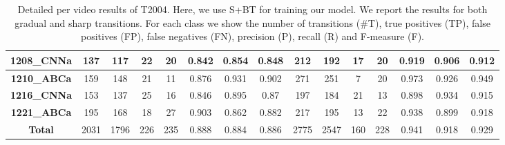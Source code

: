 \documentclass[journal]{IEEEtran}
\begin{document}
\begin{table*}[h]
\begin{tabular}{|c|c|c|c|c|c|c|c|c|c|c|c|c|c|c|}
\textbf{1208\_CNNa} & 137           & 117         & 22          & 20          & 0.842      & 0.854      & 0.848      & 212           & 192         & 17          & 20          & 0.919      & 0.906      & 0.912      \\ \hline
\textbf{1210\_ABCa} & 159           & 148         & 21          & 11          & 0.876      & 0.931      & 0.902      & 271           & 251         & 7           & 20          & 0.973      & 0.926      & 0.949      \\ \hline
\textbf{1216\_CNNa} & 153           & 137         & 25          & 16          & 0.846      & 0.895      & 0.87       & 197           & 184         & 21          & 13          & 0.898      & 0.934      & 0.915      \\ \hline
\textbf{1221\_ABCa} & 195           & 168         & 18          & 27          & 0.903      & 0.862      & 0.882      & 217           & 195         & 13          & 22          & 0.938      & 0.899      & 0.918      \\ \hline
\textbf{Total}           & 2031          & 1796        & 226         & 235         & 0.888      & 0.884      & 0.886      & 2775          & 2547        & 160         & 228         & 0.941      & 0.918      & 0.929      \\ \hline
\end{tabular}
\caption{Detailed per video results of T2004. Here, we use S+BT for training our model. We report the results for both gradual and sharp transitions. For each class we show the number of transitions (\#T), true positives (TP), false positives (FP), false negatives (FN), precision (P), recall (R) and F-measure (F).}
\label{2004_01}
\end{table*}
\end{document}
